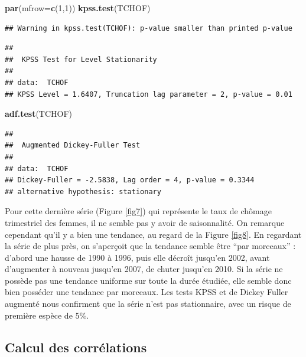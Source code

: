 \documentclass[11pt,]{article}
\newenvironment{Shaded}{\begin{snugshade}}{\end{snugshade}}
\newcommand{\KeywordTok}[1]{\textcolor[rgb]{0.13,0.29,0.53}{\textbf{#1}}}
\newcommand{\DataTypeTok}[1]{\textcolor[rgb]{0.13,0.29,0.53}{#1}}
\newcommand{\DecValTok}[1]{\textcolor[rgb]{0.00,0.00,0.81}{#1}}
\newcommand{\NormalTok}[1]{#1}
\begin{document}
\begin{Shaded}
\begin{Highlighting}[]
  \KeywordTok{par}\NormalTok{(}\DataTypeTok{mfrow=}\KeywordTok{c}\NormalTok{(}\DecValTok{1}\NormalTok{,}\DecValTok{1}\NormalTok{))}
  \KeywordTok{kpss.test}\NormalTok{(TCHOF)}
\end{Highlighting}
\end{Shaded}

\begin{verbatim}
## Warning in kpss.test(TCHOF): p-value smaller than printed p-value
\end{verbatim}

\begin{verbatim}
## 
##  KPSS Test for Level Stationarity
## 
## data:  TCHOF
## KPSS Level = 1.6407, Truncation lag parameter = 2, p-value = 0.01
\end{verbatim}

\begin{Shaded}
\begin{Highlighting}[]
  \KeywordTok{adf.test}\NormalTok{(TCHOF)}
\end{Highlighting}
\end{Shaded}

\begin{verbatim}
## 
##  Augmented Dickey-Fuller Test
## 
## data:  TCHOF
## Dickey-Fuller = -2.5838, Lag order = 4, p-value = 0.3344
## alternative hypothesis: stationary
\end{verbatim}

Pour cette dernière série (Figure \ref{fig7}) qui représente le taux de
chômage trimestriel des femmes, il ne semble pas y avoir de
saisonnalité. On remarque cependant qu'il y a bien une tendance, au
regard de la Figure \ref{fig8}. En regardant la série de plus près, on
s'aperçoit que la tendance semble être ``par morceaux'' : d'abord une
hausse de 1990 à 1996, puis elle décroît jusqu'en 2002, avant
d'augmenter à nouveau jusqu'en 2007, de chuter jusqu'en 2010. Si la
série ne possède pas une tendance uniforme sur toute la durée étudiée,
elle semble donc bien posséder une tendance par morceaux. Les tests KPSS
et de Dickey Fuller augmenté nous confirment que la série n'est pas
stationnaire, avec un risque de première espèce de 5\%.

\subsection{Calcul des corrélations}\label{calcul-des-correlations}
\end{document}
